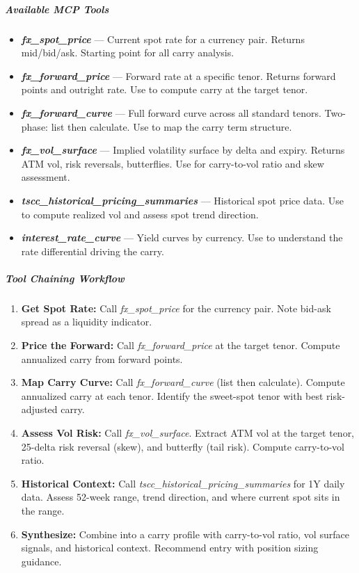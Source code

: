 \documentclass[11pt]{article}
\begin{document}
\subparagraph{Available MCP Tools}\mbox{}\par

\begin{itemize}[leftmargin=*,itemsep=2pt,topsep=2pt]
\item {} \textbf{\emph{fx\_\allowbreak{}spot\_\allowbreak{}price}} — Current spot rate for a currency pair. Returns mid/bid/ask. Starting point for all carry analysis.
\item {} \textbf{\emph{fx\_\allowbreak{}forward\_\allowbreak{}price}} — Forward rate at a specific tenor. Returns forward points and outright rate. Use to compute carry at the target tenor.
\item {} \textbf{\emph{fx\_\allowbreak{}forward\_\allowbreak{}curve}} — Full forward curve across all standard tenors. Two-phase: list then calculate. Use to map the carry term structure.
\item {} \textbf{\emph{fx\_\allowbreak{}vol\_\allowbreak{}surface}} — Implied volatility surface by delta and expiry. Returns ATM vol, risk reversals, butterflies. Use for carry-to-vol ratio and skew assessment.
\item {} \textbf{\emph{tscc\_\allowbreak{}historical\_\allowbreak{}pricing\_\allowbreak{}summaries}} — Historical spot price data. Use to compute realized vol and assess spot trend direction.
\item {} \textbf{\emph{interest\_\allowbreak{}rate\_\allowbreak{}curve}} — Yield curves by currency. Use to understand the rate differential driving the carry.
\end{itemize}

\subparagraph{Tool Chaining Workflow}\mbox{}\par

\begin{enumerate}[leftmargin=*,itemsep=2pt,topsep=2pt]
\item {} \textbf{Get Spot Rate:} Call \emph{fx\_\allowbreak{}spot\_\allowbreak{}price} for the currency pair. Note bid-ask spread as a liquidity indicator.
\item {} \textbf{Price the Forward:} Call \emph{fx\_\allowbreak{}forward\_\allowbreak{}price} at the target tenor. Compute annualized carry from forward points.
\item {} \textbf{Map Carry Curve:} Call \emph{fx\_\allowbreak{}forward\_\allowbreak{}curve} (list then calculate). Compute annualized carry at each tenor. Identify the sweet-spot tenor with best risk-adjusted carry.
\item {} \textbf{Assess Vol Risk:} Call \emph{fx\_\allowbreak{}vol\_\allowbreak{}surface}. Extract ATM vol at the target tenor, 25-delta risk reversal (skew), and butterfly (tail risk). Compute carry-to-vol ratio.
\item {} \textbf{Historical Context:} Call \emph{tscc\_\allowbreak{}historical\_\allowbreak{}pricing\_\allowbreak{}summaries} for 1Y daily data. Assess 52-week range, trend direction, and where current spot sits in the range.
\item {} \textbf{Synthesize:} Combine into a carry profile with carry-to-vol ratio, vol surface signals, and historical context. Recommend entry with position sizing guidance.
\end{enumerate}
\end{document}
